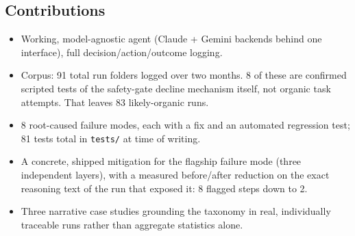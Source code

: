 \documentclass[11pt]{article}
\begin{document}
\subsection*{Contributions}
\begin{datanote}
\begin{itemize}[leftmargin=1.4em]
  \item Working, model-agnostic agent (Claude + Gemini backends behind one interface), full decision/action/outcome logging.
  \item Corpus: 91 total run folders logged over two months. 8 of these are confirmed scripted tests of the safety-gate decline mechanism itself, not organic task attempts. That leaves 83 likely-organic runs.
  \item 8 root-caused failure modes, each with a fix and an automated regression test; 81 tests total in \texttt{tests/} at time of writing.
  \item A concrete, shipped mitigation for the flagship failure mode (three independent layers), with a measured before/after reduction on the exact reasoning text of the run that exposed it: 8 flagged steps down to 2.
  \item Three narrative case studies grounding the taxonomy in real, individually traceable runs rather than aggregate statistics alone.
\end{itemize}
\end{datanote}
\end{document}
